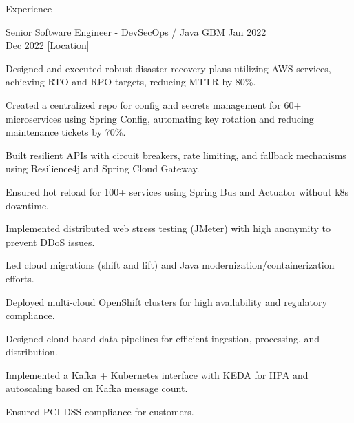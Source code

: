 \documentclass{resume} %
\begin{document}
\begin{rSection}{Experience}
    \begin{rSubsection}
        {Senior Software Engineer - DevSecOps / Java}
        {GBM}
        {Jan 2022 \\ Dec 2022}
        [Location]
        \begin{rItemize}
            \item Designed and executed robust disaster recovery plans utilizing AWS services, achieving RTO and RPO targets, reducing MTTR by 80\%.
            \item Created a centralized repo for config and secrets management for 60+ microservices using Spring Config, automating key rotation and reducing maintenance tickets by 70\%.
            \item Built resilient APIs with circuit breakers, rate limiting, and fallback mechanisms using Resilience4j and Spring Cloud Gateway.
            \item Ensured hot reload for 100+ services using Spring Bus and Actuator without k8s downtime.
            \item Implemented distributed web stress testing (JMeter) with high anonymity to prevent DDoS issues.
            \item Led cloud migrations (shift and lift) and Java modernization/containerization efforts.
            \item Deployed multi-cloud OpenShift clusters for high availability and regulatory compliance.
            \item Designed cloud-based data pipelines for efficient ingestion, processing, and distribution.
            \item Implemented a Kafka + Kubernetes interface with KEDA for HPA and autoscaling based on Kafka message count.
            \item Ensured PCI DSS compliance for customers.
        \end{rItemize}
    \end{rSubsection}


\end{rSection}
\end{document}
